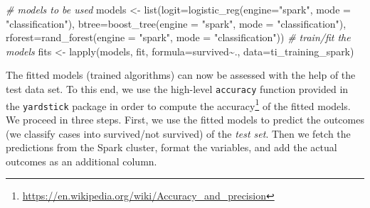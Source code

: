 \documentclass[
  12pt,
]{style/krantz}
\newenvironment{Shaded}{\begin{snugshade}}{\end{snugshade}}
\newcommand{\AttributeTok}[1]{\textcolor[rgb]{0.77,0.63,0.00}{#1}}
\newcommand{\CommentTok}[1]{\textcolor[rgb]{0.56,0.35,0.01}{\textit{#1}}}
\newcommand{\ControlFlowTok}[1]{\textcolor[rgb]{0.13,0.29,0.53}{\textbf{#1}}}
\newcommand{\DecValTok}[1]{\textcolor[rgb]{0.00,0.00,0.81}{#1}}
\newcommand{\FunctionTok}[1]{\textcolor[rgb]{0.00,0.00,0.00}{#1}}
\newcommand{\NormalTok}[1]{#1}
\newcommand{\OtherTok}[1]{\textcolor[rgb]{0.56,0.35,0.01}{#1}}
\newcommand{\SpecialCharTok}[1]{\textcolor[rgb]{0.00,0.00,0.00}{#1}}
\newcommand{\StringTok}[1]{\textcolor[rgb]{0.31,0.60,0.02}{#1}}
\renewcommand{\href}[2]{#2\footnote{\url{#1}}}
\begin{document}
\begin{Shaded}
\begin{Highlighting}[]
\CommentTok{\# models to be used}
\NormalTok{models }\OtherTok{\textless{}{-}} \FunctionTok{list}\NormalTok{(}\AttributeTok{logit=}\FunctionTok{logistic\_reg}\NormalTok{(}\AttributeTok{engine=}\StringTok{"spark"}\NormalTok{, }\AttributeTok{mode =} \StringTok{"classification"}\NormalTok{),}
               \AttributeTok{btree=}\FunctionTok{boost\_tree}\NormalTok{(}\AttributeTok{engine =} \StringTok{"spark"}\NormalTok{, }\AttributeTok{mode =} \StringTok{"classification"}\NormalTok{),}
               \AttributeTok{rforest=}\FunctionTok{rand\_forest}\NormalTok{(}\AttributeTok{engine =} \StringTok{"spark"}\NormalTok{, }\AttributeTok{mode =} \StringTok{"classification"}\NormalTok{))}
\CommentTok{\# train/fit the models}
\NormalTok{fits }\OtherTok{\textless{}{-}} \FunctionTok{lapply}\NormalTok{(models, fit, }\AttributeTok{formula=}\NormalTok{survived}\SpecialCharTok{\textasciitilde{}}\NormalTok{., }\AttributeTok{data=}\NormalTok{ti\_training\_spark)}
\end{Highlighting}
\end{Shaded}

The fitted models (trained algorithms) can now be assessed with the help of the test data set. To this end, we use the high-level \texttt{accuracy} function provided in the \texttt{yardstick} package in order to compute the \href{https://en.wikipedia.org/wiki/Accuracy_and_precision}{accuracy} of the fitted models. We proceed in three steps. First, we use the fitted models to predict the outcomes (we classify cases into survived/not survived) of the \emph{test set}. Then we fetch the predictions from the Spark cluster, format the variables, and add the actual outcomes as an additional column.

\begin{Shaded}
\end{Shaded}
\end{document}
